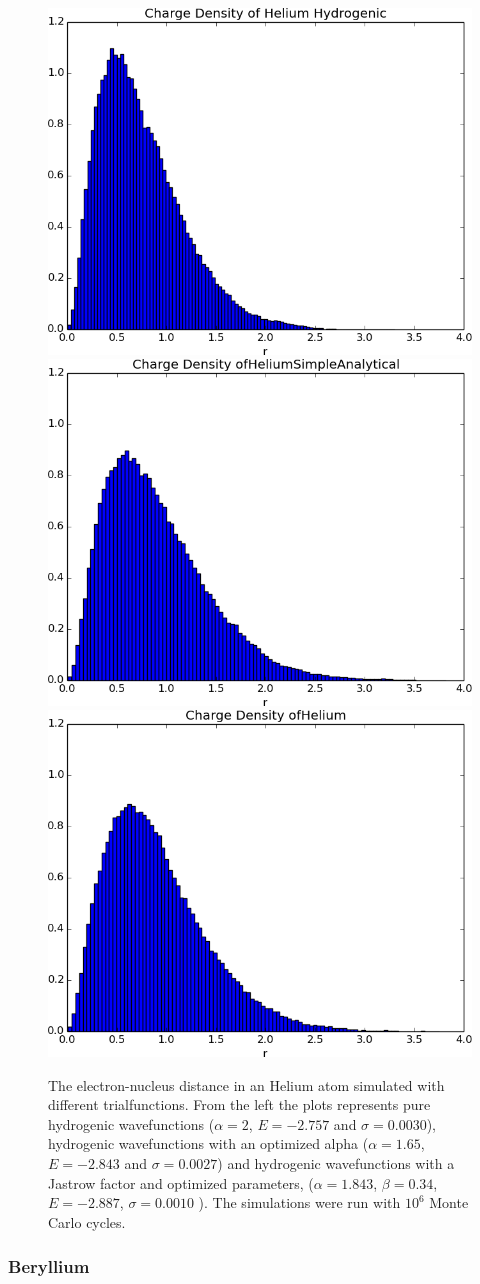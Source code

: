 		\begin{figure}
				\centering 
				\includegraphics[width=0.32\linewidth]{../figures/used/ChargeDensityHeliumHydrogenic}
				\includegraphics[width=0.32\linewidth]{../figures/used/ChargeDensityHeliumSimpleAnalytical}
				\includegraphics[width=0.32\linewidth]{../figures/used/ChargeDensityHelium_trimmed}
				\protect\caption{The electron-nucleus distance in an Helium atom simulated with different trialfunctions. From the left the plots represents pure hydrogenic wavefunctions ($\alpha = 2$, $E = -2.757$ and $\sigma = 0.0030$), hydrogenic wavefunctions with an optimized alpha ($\alpha = 1.65$, $E = -2.843$ and $\sigma = 0.0027$) and hydrogenic wavefunctions with a Jastrow factor and optimized parameters, ($\alpha = 1.843$, $\beta = 0.34$, $E = -2.887$, $\sigma = 0.0010$ ). The simulations were run with \(10^6\) Monte Carlo cycles.}
				\label{fig:HeliumChargeDensity}
		\end{figure}


	\subsubsection{Beryllium}


